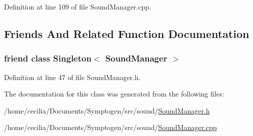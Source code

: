 Definition at line 109 of file Sound\-Manager.\-cpp.



\subsection{Friends And Related Function Documentation}
\hypertarget{class_symp_1_1_sound_manager_a0caa66cbb01357370233dc2bd5fdb585}{
\subsubsection[{Singleton$<$ Sound\-Manager $>$}]{\setlength{\rightskip}{0pt plus 5cm}friend class {\bf Singleton}$<$ {\bf Sound\-Manager} $>$\hspace{0.3cm}{\ttfamily [friend]}}}\label{class_symp_1_1_sound_manager_a0caa66cbb01357370233dc2bd5fdb585}


Definition at line 47 of file Sound\-Manager.\-h.



The documentation for this class was generated from the following files\-:\begin{DoxyCompactItemize}
\item 
/home/cecilia/\-Documents/\-Symptogen/src/sound/\hyperlink{_sound_manager_8h}{Sound\-Manager.\-h}\item 
/home/cecilia/\-Documents/\-Symptogen/src/sound/\hyperlink{_sound_manager_8cpp}{Sound\-Manager.\-cpp}\end{DoxyCompactItemize}
